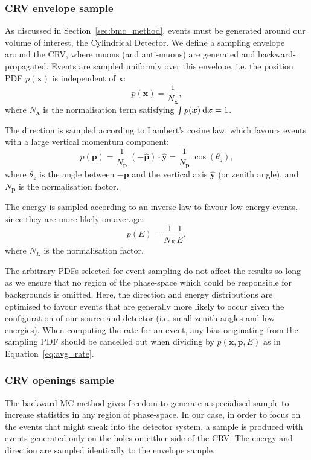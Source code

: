 \subsubsection{CRV envelope sample}
As discussed in Section~\ref{sec:bmc_method}, events must be generated around
our volume of interest, the Cylindrical Detector. We define a sampling
envelope around the CRV, where muons (and anti-muons) are generated and
backward-propagated. Events are sampled uniformly over this
envelope, i.e. the position PDF $p(\bm{x})$ is independent of $\bm{x}$:
$$
p(\bm{x}) = \frac{1}{N_{\bm{x}}},
$$
where $N_{\bm{x}}$ is the normalisation term satisfying 
$\int p(\bm{x}) \: \textnormal{d}\bm{x} = 1$.

The direction is sampled according to Lambert's cosine law, which favours events
with a large vertical momentum component:
$$
p(\bm{p}) = 
    \frac{1}{N_{\bm{p}}} \ (-\hat{\bm{p}}) \cdot \hat{\bm{y}} = 
    \frac{1}{N_{\bm{p}}}\:\cos(\theta_z),
$$
where $\theta_z$ is the angle between $-\bm{p}$ and the vertical axis $\hat{\bm{y}}$
(or zenith angle), and $N_{\bm{p}}$ is the normalisation factor. 

The energy is sampled according to an inverse law to
favour low-energy events, since they are more likely on average:
$$
p(E) = \frac{1}{N_E}  \frac{1}{E},
$$
where $N_E$ is the normalisation factor. 

The arbitrary PDFs selected for event sampling do not affect the results so long
as we ensure that no region of the phase-space which could be responsible for
backgrounds is omitted. Here, the direction and energy distributions are
optimised to favour events that are generally more likely to
occur given the configuration of our source and detector (i.e. small zenith
angles and low energies). When computing the rate for an event, any bias
originating from the sampling PDF should be cancelled out when dividing by
$p(\bm{x}, \bm{p}, E)$ as in Equation~\ref{eq:avg_rate}.



\subsubsection{CRV openings sample}
The backward MC method gives freedom to generate a specialised sample to
increase statistics in any region of phase-space. In our case, in order to focus
on the events that might sneak into the detector system, a sample is produced
with events generated only on the holes on either side of the CRV. The energy
and direction are sampled identically to the envelope sample.

